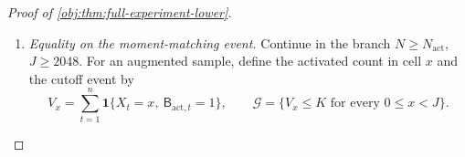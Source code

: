 \begin{proof}[Proof of \cref{obj:thm:full-experiment-lower}]
\begin{enumerate}
For \(\iota\in\{0,1\}\), draw
\[
\mathbf Z=(Z_x)_{x=0}^{d-1}\sim\Pi_\iota^{\otimes d}
\]
once for the entire sample. Define the observed mixture law
\[
Q_{\mathrm{act},\iota}
=\int_{[1,H]^d}
\mathcal L_{P_{\mathrm{act},\mathbf z}}(\mathbf O_n)\,
d\Pi_\iota^{\otimes d}(\mathbf z),
\]
and let \(\widetilde Q_{\mathrm{act},\iota}\) be the corresponding augmented
law constructed in \cref{obj:def:activation-lower-handle}. Thus
\[
\widetilde Q_{\mathrm{act},\iota}
=
\int_{[1,H]^d}
\mathcal L\!\left(
(\mathsf B_{\mathrm{act},t},O_t)_{t=1}^{n}
\,\middle|\,\mathbf Z=\mathbf z\right)
d\Pi_\iota^{\otimes d}(\mathbf z).
\]
The activation flags have probability \(qH\), independently of the latent
vector and the baseline and treatment pattern.

At the record level, forgetting the flag gives the following probabilities
for the three marks \((R,RY)=(1,1),(1,0),(0,0)\):
\[
\begin{array}{c|ccc}
& (1,1)&(1,0)&(0,0)\\ \hline
A=1,\ X=x<J&q&q(z_x-1)&1-qz_x\\
A=0,\ X=x<J&0&qz_x&1-qz_x\\
X\ge J&0&qH&1-qH
\end{array}
\]
These are exactly the probabilities induced by \(P_{\mathrm{act},\mathbf z}\).
Define the forgetting map by
\[
\operatorname{pr}_{\mathrm{obs}}
\bigl((\mathsf B_{\mathrm{act},t},O_t)_{t=1}^{n}\bigr)
=(O_t)_{t=1}^{n}.
\]
Conditional independence of the records and integration over the common
latent vector therefore give
\[
Q_{\mathrm{act},\iota}
=\widetilde Q_{\mathrm{act},\iota}
\circ\operatorname{pr}_{\mathrm{obs}}^{-1}.
\]

\item \emph{Equality on the moment-matching event.}
Continue in the branch \(N\ge N_{\mathrm{act}}\), \(J\ge2048\).
For an augmented sample, define the activated count in cell \(x\) and the
cutoff event by
\[
V_x=\sum_{t=1}^{n}
\mathbf1\{X_t=x,\ \mathsf B_{\mathrm{act},t}=1\},
\qquad
\mathcal G=\{V_x\le K\text{ for every }0\le x<J\}.
\]


\end{enumerate}
\end{proof}
